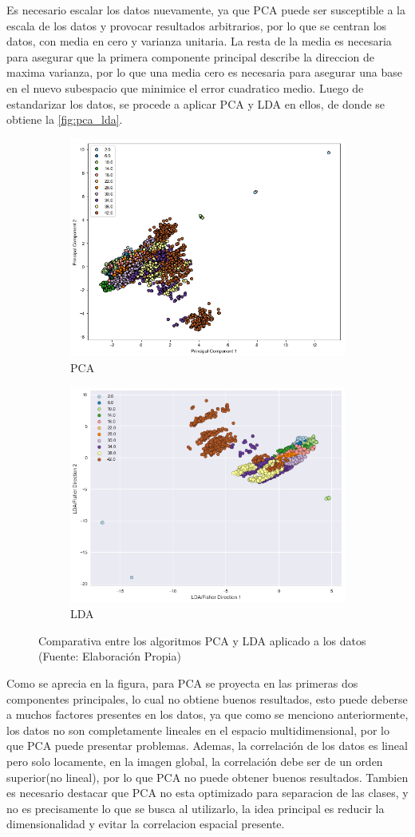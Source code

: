 Es necesario escalar los datos nuevamente, ya que PCA puede ser susceptible a la escala de los datos y provocar resultados arbitrarios, por lo que se centran los datos,  con media en cero y  varianza unitaria. La resta de la media es necesaria para asegurar que la primera componente principal describe la direccion de maxima varianza, por lo que una media cero es necesaria para asegurar una base en el nuevo subespacio que minimice el error cuadratico medio. Luego de estandarizar los datos, se procede a aplicar PCA y LDA en ellos, de donde se obtiene la \autoref{fig:pca_lda}.

\begin{figure}[ht!]
\centering
\begin{subfigure}{.5\textwidth}
  \centering
  \includegraphics[width=.4\linewidth]{figures/pca.png}
  \caption{PCA}
  \label{fig:sub1}
\end{subfigure}%
\begin{subfigure}{.5\textwidth}
  \centering
  \includegraphics[width=.4\linewidth]{figures/lda.png}
  \caption{LDA}
  \label{fig:sub2}
\end{subfigure}
\caption[abs]{Comparativa entre los algoritmos PCA y LDA aplicado a los datos \\
{\scriptsize (Fuente: Elaboración Propia)}}
\label{fig:pca_lda}
\end{figure}

Como se aprecia en la figura, para PCA se proyecta en las primeras dos componentes principales, lo cual no obtiene buenos resultados, esto puede deberse a muchos factores presentes en los datos, ya que como se menciono anteriormente, los datos no son completamente lineales en el espacio multidimensional, por lo que PCA puede presentar problemas. Ademas, la correlación de los datos es lineal pero solo locamente, en la imagen global, la correlación debe ser de un orden superior(no lineal), por lo que PCA no puede obtener buenos resultados. Tambien es necesario destacar que PCA no esta optimizado para separacion de las clases, y no es precisamente lo que se busca al utilizarlo, la idea principal es reducir la dimensionalidad y evitar la correlacion espacial presente. 

